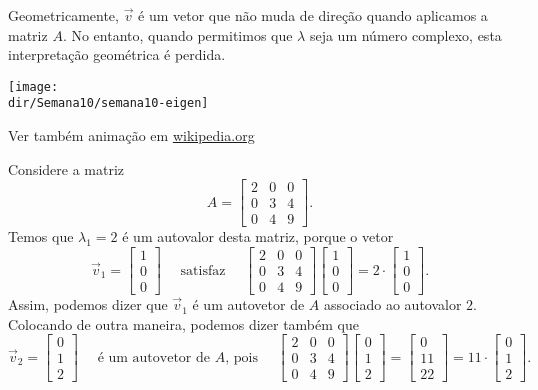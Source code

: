 \documentclass[../livro.tex]{subfiles}  %
\providecommand{\dir}{..}
\begin{document}
Geometricamente, $\vec{v}$ é um vetor que não muda de direção quando aplicamos a matriz $A$. No entanto, quando permitimos que $\lambda$ seja um número complexo, esta interpretação geométrica é perdida.

		\texttt{[image: \\dir/Semana10/semana10-eigen]}

\noindent Ver também animação em \href{https://en.wikipedia.org/wiki/Eigenvalues_and_eigenvectors#Matrix_examples}{wikipedia.org}

\begin{example}
	Considere a matriz
	\begin{equation}
	A={\begin{bmatrix}2&0&0\\0&3&4\\0&4&9\end{bmatrix}}.
	\end{equation} Temos que $\lambda_1 = 2$ é um autovalor desta matriz, porque o vetor
	\begin{equation}
	\vec{v}_1 =
	{\begin{bmatrix}1\\0\\0\end{bmatrix}} \quad \text{ satisfaz } \quad {\begin{bmatrix}2&0&0\\0&3&4\\0&4&9\end{bmatrix}} {\begin{bmatrix}1\\0\\0\end{bmatrix}} = 2 \cdot {\begin{bmatrix}1\\0\\0\end{bmatrix}}.
	\end{equation} Assim, podemos dizer que $\vec{v}_1$ é um autovetor de $A$ associado ao autovalor $2$. Colocando de outra maneira, podemos dizer também que
	\begin{equation}
	\vec{v}_2 =
	{\begin{bmatrix}0\\1\\2\end{bmatrix}} \quad \text{ é um autovetor de $A$, pois } \quad {\begin{bmatrix}2&0&0\\0&3&4\\0&4&9\end{bmatrix}} {\begin{bmatrix}0\\1\\2\end{bmatrix}} = {\begin{bmatrix}0\\11\\22\end{bmatrix}} = 11 \cdot {\begin{bmatrix}0\\1\\2\end{bmatrix}}.

\end{equation}
\end{example}
\end{document}
